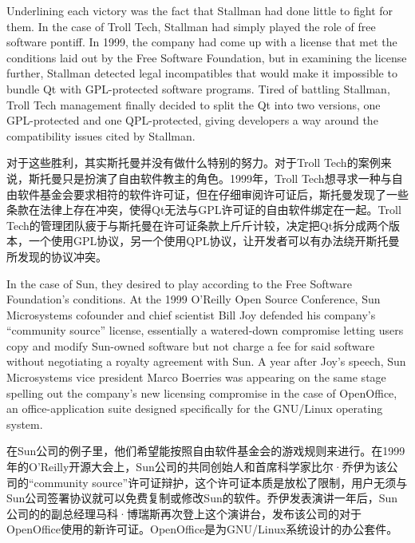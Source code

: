 
\ifdefined\eng
Underlining each victory was the fact that Stallman had done little to fight for them. In the case of Troll Tech, Stallman had simply played the role of free software pontiff. In 1999, the company had come up with a license that met the conditions laid out by the Free Software Foundation, but in examining the license further, Stallman detected legal incompatibles that would make it impossible to bundle Qt with GPL-protected software programs. Tired of battling Stallman, Troll Tech management finally decided to split the Qt into two versions, one GPL-protected and one QPL-protected, giving developers a way around the compatibility issues cited by Stallman.
\fi

\ifdefined\chs
对于这些胜利，其实斯托曼并没有做什么特别的努力。对于Troll Tech的案例来说，斯托曼只是扮演了自由软件教主的角色。1999年，Troll Tech想寻求一种与自由软件基金会要求相符的软件许可证，但在仔细审阅许可证后，斯托曼发现了一些条款在法律上存在冲突，使得Qt无法与GPL许可证的自由软件绑定在一起。Troll Tech的管理团队疲于与斯托曼在许可证条款上斤斤计较，决定把Qt拆分成两个版本，一个使用GPL协议，另一个使用QPL协议，让开发者可以有办法绕开斯托曼所发现的协议冲突。
\fi

\ifdefined\eng
In the case of Sun, they desired to play according to the Free Software Foundation's conditions. At the 1999 O'Reilly Open Source Conference, Sun Microsystems cofounder and chief scientist Bill Joy defended his company's ``community source'' license, essentially a watered-down compromise letting users copy and modify Sun-owned software but not charge a fee for said software without negotiating a royalty agreement with Sun. A year after Joy's speech, Sun Microsystems vice president Marco Boerries was appearing on the same stage spelling out the company's new licensing compromise in the case of OpenOffice, an office-application suite designed specifically for the GNU/Linux operating system.
\fi

\ifdefined\chs
在Sun公司的例子里，他们希望能按照自由软件基金会的游戏规则来进行。在1999年的O'Reilly开源大会上，Sun公司的共同创始人和首席科学家比尔·乔伊为该公司的``community source''许可证辩护，这个许可证本质是放松了限制，用户无须与Sun公司签署协议就可以免费复制或修改Sun的软件。乔伊发表演讲一年后，Sun公司的的副总经理马科·博瑞斯再次登上这个演讲台，发布该公司的对于OpenOffice使用的新许可证。OpenOffice是为GNU/Linux系统设计的办公套件。
\fi

